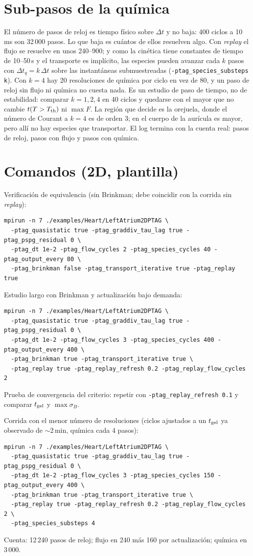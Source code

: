 \documentclass[11pt,a4paper]{article}
\begin{document}
\section{Sub-pasos de la química}

El número de pasos de reloj es tiempo físico sobre $\Delta t$ y no baja: 400 ciclos a 10\,ms son 32\,000 pasos. Lo que baja es cuántos de ellos resuelven algo. Con \emph{replay} el flujo se resuelve en unos 240--900; y como la cinética tiene constantes de tiempo de 10--50\,s y el transporte es implícito, las especies pueden avanzar cada $k$ pasos con $\Delta t_q=k\,\Delta t$ sobre las instantáneas submuestreadas (\texttt{-ptag\_species\_substeps k}). Con $k=4$ hay 20 resoluciones de química por ciclo en vez de 80, y un paso de reloj sin flujo ni química no cuesta nada. Es un estudio de paso de tiempo, no de estabilidad: comparar $k=1,2,4$ en 40 ciclos y quedarse con el mayor que no cambie $t(T>T_{\rm th})$ ni $\max F$. La región que decide es la orejuela, donde el número de Courant a $k=4$ es de orden 3; en el cuerpo de la aurícula es mayor, pero allí no hay especies que transportar. El log termina con la cuenta real: pasos de reloj, pasos con flujo y pasos con química.

\section{Comandos (2D, plantilla)}

Verificación de equivalencia (sin Brinkman; debe coincidir con la corrida sin \emph{replay}):
\begin{verbatim}
mpirun -n 7 ./examples/Heart/LeftAtrium2DPTAG \
  -ptag_quasistatic true -ptag_graddiv_tau_lag true -ptag_pspg_residual 0 \
  -ptag_dt 1e-2 -ptag_flow_cycles 2 -ptag_species_cycles 40 -ptag_output_every 80 \
  -ptag_brinkman false -ptag_transport_iterative true -ptag_replay true
\end{verbatim}
Estudio largo con Brinkman y actualización bajo demanda:
\begin{verbatim}
mpirun -n 7 ./examples/Heart/LeftAtrium2DPTAG \
  -ptag_quasistatic true -ptag_graddiv_tau_lag true -ptag_pspg_residual 0 \
  -ptag_dt 1e-2 -ptag_flow_cycles 3 -ptag_species_cycles 400 -ptag_output_every 400 \
  -ptag_brinkman true -ptag_transport_iterative true \
  -ptag_replay true -ptag_replay_refresh 0.2 -ptag_replay_flow_cycles 2
\end{verbatim}
Prueba de convergencia del criterio: repetir con \texttt{-ptag\_replay\_refresh 0.1} y comparar $t_{\rm gel}$ y $\max\sigma_B$.

Corrida con el menor número de resoluciones (ciclos ajustados a un $t_{\rm gel}$ ya observado de $\sim$2\,min, química cada 4 pasos):
\begin{verbatim}
mpirun -n 7 ./examples/Heart/LeftAtrium2DPTAG \
  -ptag_quasistatic true -ptag_graddiv_tau_lag true -ptag_pspg_residual 0 \
  -ptag_dt 1e-2 -ptag_flow_cycles 3 -ptag_species_cycles 150 -ptag_output_every 400 \
  -ptag_brinkman true -ptag_transport_iterative true \
  -ptag_replay true -ptag_replay_refresh 0.2 -ptag_replay_flow_cycles 2 \
  -ptag_species_substeps 4
\end{verbatim}
Cuenta: 12\,240 pasos de reloj; flujo en 240 más 160 por actualización; química en 3\,000.
\end{document}
